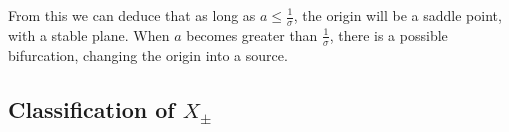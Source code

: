 \message{ !name(chua_circuit.tex)}\documentclass[twocolumn,10pt]{article}
\begin{document}
From this we can deduce that as long as $a \leq \frac{1}{\sigma}$, the
origin will be a saddle point, with a stable plane.  When $a$ becomes
greater than $\frac{1}{\sigma}$, there is a possible bifurcation,
changing the origin into a source.

\subsection{Classification of $X_\pm$}




\end{document}
